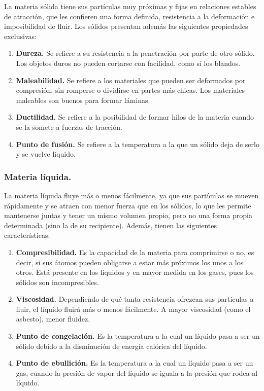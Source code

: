 \documentclass[14pt]{extarticle}
\begin{document}
La materia sólida tiene sus partículas muy próximas y fijas en relaciones estables de atracción, que les confieren una forma definida, resistencia a la deformación e imposibilidad de fluir. Los sólidos presentan además las siguientes propiedades exclusivas:

\begin{enumerate}
\item \textbf{Dureza.} Se refiere a su resistencia a la penetración por parte de otro sólido. Los objetos duros no pueden cortarse con facilidad, como sí los blandos.
\item \textbf{Maleabilidad.} Se refiere a los materiales que pueden ser deformados por compresión, sin romperse o dividirse en partes más chicas. Los materiales maleables son buenos para formar láminas.
\item \textbf{Ductilidad.} Se refiere a la posibilidad de formar hilos de la materia cuando se la somete a fuerzas de tracción.
\item \textbf{Punto de fusión.} Se refiere a la temperatura a la que un sólido deja de serlo y se vuelve líquido.
\end{enumerate}

\subsubsection{Materia líquida.}

La materia líquida fluye más o menos fácilmente, ya que sus partículas se mueven rápidamente y se atraen con menor fuerza que en los sólidos, lo que les permite mantenerse juntas y tener un mismo volumen propio, pero no una forma propia determinada (sino la de su recipiente). Además, tienen las siguientes características:

\begin{enumerate}
\item \textbf{Compresibilidad.} Es la capacidad de la materia para comprimirse o no, es decir, si sus átomos pueden obligarse a estar más próximos los unos a los otros. Está presente en los líquidos y en mayor medida en los gases, pues los sólidos son incompresibles.
\item \textbf{Viscosidad.} Dependiendo de qué tanta resistencia ofrezcan sus partículas a fluir, el líquido fluirá más o menos fácilmente. A mayor viscosidad (como el asbesto), menor fluidez.
\item \textbf{Punto de congelación.} Es la temperatura a la cual un líquido pasa a ser un sólido debido a la disminución de energía calórica del líquido.
\item \textbf{Punto de ebullición.} Es la temperatura a la cual un líquido pasa a ser un gas, cuando la presión de vapor del líquido se iguala a la presión que rodea al líquido.
\end{enumerate}
\end{document}
